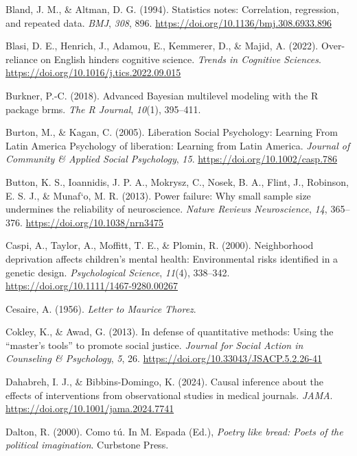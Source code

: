 \documentclass[
  letterpaper,
  DIV=11,
  numbers=noendperiod]{scrreprt}
\newlength{\cslhangindent}
\newenvironment{CSLReferences}[2] %
 {\begin{list}{}{%
  \setlength{\itemindent}{0pt}
  \setlength{\leftmargin}{0pt}
  \setlength{\parsep}{0pt}
  \ifodd #1
   \setlength{\leftmargin}{\cslhangindent}
   \setlength{\itemindent}{-1\cslhangindent}
  \fi
  \setlength{\itemsep}{#2\baselineskip}}}
 {\end{list}}
\begin{document}
\begin{CSLReferences}{1}{0}
Bland, J. M., \& Altman, D. G. (1994). Statistics notes: Correlation,
regression, and repeated data. \emph{BMJ}, \emph{308}, 896.
\url{https://doi.org/10.1136/bmj.308.6933.896}

Blasi, D. E., Henrich, J., Adamou, E., Kemmerer, D., \& Majid, A.
(2022). Over-reliance on {E}nglish hinders cognitive science.
\emph{Trends in Cognitive Sciences}.
\url{https://doi.org/10.1016/j.tics.2022.09.015}

Burkner, P.-C. (2018). Advanced {B}ayesian multilevel modeling with the
{R} package brms. \emph{The R Journal}, \emph{10}(1), 395--411.

Burton, M., \& Kagan, C. (2005). {Liberation Social Psychology: Learning
From Latin America Psychology of liberation: Learning from Latin
America}. \emph{Journal of Community \& Applied Social Psychology},
\emph{15}. \url{https://doi.org/10.1002/casp.786}

Button, K. S., Ioannidis, J. P. A., Mokrysz, C., Nosek, B. A., Flint,
J., Robinson, E. S. J., \& Munaf`o, M. R. (2013). Power failure: Why
small sample size undermines the reliability of neuroscience.
\emph{Nature Reviews Neuroscience}, \emph{14}, 365--376.
\url{https://doi.org/10.1038/nrn3475}

Caspi, A., Taylor, A., Moffitt, T. E., \& Plomin, R. (2000).
Neighborhood deprivation affects children's mental health: Environmental
risks identified in a genetic design. \emph{Psychological Science},
\emph{11}(4), 338--342. \url{https://doi.org/10.1111/1467-9280.00267}

Cesaire, A. (1956). \emph{Letter to {M}aurice {T}horez}.

Cokley, K., \& Awad, G. (2013). In defense of quantitative methods:
Using the {``master's tools''} to promote social justice. \emph{Journal
for Social Action in Counseling \& Psychology}, \emph{5}, 26.
\url{https://doi.org/10.33043/JSACP.5.2.26-41}

Dahabreh, I. J., \& Bibbins-Domingo, K. (2024). Causal inference about
the effects of interventions from observational studies in medical
journals. \emph{JAMA}. \url{https://doi.org/10.1001/jama.2024.7741}

Dalton, R. (2000). Como t{ú}. In M. Espada (Ed.), \emph{Poetry like
bread: Poets of the political imagination}. Curbstone Press.


\end{CSLReferences}
\end{document}
